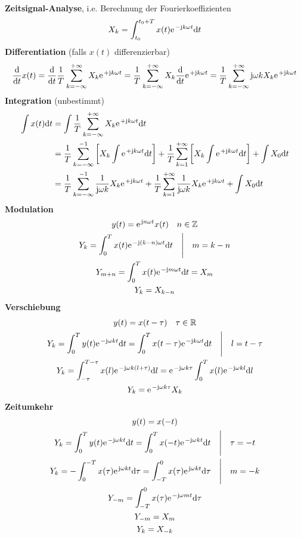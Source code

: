 \documentclass[11pt,a4paper,DIV=12]{scrartcl}
\begin{document}
\textbf{Zeitsignal-Analyse}, i.e. Berechnung der Fourierkoeffizienten
\begin{gather}
	X_k=\int_{t_0}^{t_0+T}x(t)\e^{-\im k \omega t}\mathrm{d}t
\end{gather}
%
%
%
\textbf{Differentiation} (falls $x(t)$ differenzierbar)
%
%
\begin{gather}
	\frac{\mathrm{d}}{\mathrm{d}t}x(t)
	=\frac{\mathrm{d}}{\mathrm{d}t}\frac{1}{T}\sum_{k=-\infty}^{+\infty}X_k\e^{+\im k \omega t}
	=\frac{1}{T}\sum_{k=-\infty}^{+\infty}X_k\frac{\mathrm{d}}{\mathrm{d}t}\e^{+\im k \omega t}
	=\frac{1}{T}\sum_{k=-\infty}^{+\infty}\im\omega kX_k\e^{+\im k \omega t}
\end{gather}
%
%
\textbf{Integration} (unbestimmt)
%
%
\begin{align}
	\int x(t)\mathrm{d}t&=\int\frac{1}{T}\sum_{k=-\infty}^{+\infty}X_k\e^{+\im k \omega t}\mathrm{d}t \\
	&= \frac{1}{T}\sum_{k=-\infty}^{-1}\bigg [X_k\int\e^{+\im k \omega t}\mathrm{d}t\bigg ]+\frac{1}{T}\sum_{k=1}^{+\infty}\bigg [X_k\int\e^{+\im k \omega t}\mathrm{d}t\bigg ]+\int X_0\mathrm{d}t\\
	&=\frac{1}{T}\sum_{k=-\infty}^{-1}\frac{1}{\im\omega k}X_k\e^{+\im k \omega t}+\frac{1}{T}\sum_{k=1}^{+\infty}\frac{1}{\im\omega k}X_k\e^{+\im k \omega t}+\int X_0\mathrm{d}t
\end{align}
\textbf{Modulation}
\begin{gather}
	y(t)=\e^{\im n\omega t}x(t) \quad n\in\mathbb{Z}\\
	Y_k=\int_0^Tx(t)\e^{-\im(k-n)\omega t}\mathrm{d}t\quad\Bigg | \quad m = k-n \\
	Y_{m+n}=\int_0^Tx(t)\e^{-\im  m \omega t}\mathrm{d}t=X_m \\
	Y_{k}=X_{k-n}
\end{gather}
\textbf{Verschiebung}
\begin{gather}
	y(t)=x(t-\tau)\quad\tau\in\mathbb{R}\\
	Y_k=\int_0^{T}y(t)\e^{-\im\omega k t}\mathrm{d}t
	=\int_0^{T}x(t-\tau)\e^{-\im k \omega t}\mathrm{d}t \quad \Bigg | \quad l = t-\tau\\
	Y_k=\int_{-\tau}^{T-\tau}x(l)\e^{-\im\omega k (l+\tau)}\mathrm{d}l=\e^{-\im \omega k \tau}\int_{0}^{T}x(l)\e^{-\im\omega k l}\mathrm{d}l \\
	Y_k=\e^{-\im\omega k \tau}X_k
\end{gather}
\textbf{Zeitumkehr}
\begin{gather}
	y(t)=x(-t) \\
	Y_k=\int_0^{T}y(t)\e^{-\im\omega k t}\mathrm{d}t=\int_0^{T}x(-t)\e^{-\im\omega k t}\mathrm{d}t\quad\Bigg | \quad \tau = -t \\
	Y_k=-\int_0^{-T}x(\tau)\e^{\im\omega k t}\mathrm{d}\tau=\int_{-T}^{0}x(\tau)\e^{\im\omega k t}\mathrm{d}\tau \quad \Bigg |\quad m = -k \\
	Y_{-m}=\int_{-T}^{0}x(\tau)\e^{-\im\omega m t}\mathrm{d}\tau \\
	Y_{-m}=X_m \\
	Y_{k}=X_{-k}
\end{gather}
\end{document}
